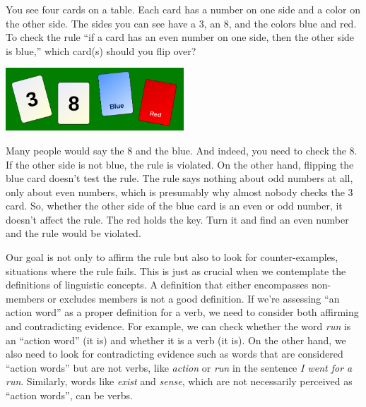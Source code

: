 \begin{tcolorbox}[float*, title=A thinking trap, colback=white]
    You see four cards on a table. Each card has a number on one side and a color on the other side. The sides you can see have a 3, an 8, and the colors blue and red. To check the rule ``if a card has an even number on one side, then the other side is blue,'' which card(s) should you flip over?
    \begin{center}
        \includegraphics[width=0.5\textwidth]{figures/wason.png}
        \tiny {}
    \end{center}
    Many people would say the 8 and the blue. And indeed, you need to check the 8. If the other side is not blue, the rule is violated. On the other hand, flipping the blue card doesn't test the rule. The rule says nothing about odd numbers at all, only about even numbers, which is presumably why almost nobody checks the 3 card. So, whether the other side of the blue card is an even or odd number, it doesn't affect the rule. The red holds the key. Turn it and find an even number and the rule would be violated.

    Our goal is not only to affirm the rule but also to look for counter-examples, situations where the rule fails. This is just as crucial when we contemplate the definitions of linguistic concepts. A definition that either encompasses non-members or excludes members is not a good definition. If we're assessing ``an action word'' as a proper definition for a verb, we need to consider both affirming and contradicting evidence. For example, we can check whether the word \textit{run} is an ``action word'' (it is) and whether it is a verb (it is). On the other hand, we also need to look for contradicting evidence such as words that are considered ``action words'' but are not verbs, like \textit{action} or \textit{run} in the sentence \textit{I went for a run}. Similarly, words like \textit{exist} and \textit{sense}, which are not necessarily perceived as ``action words'', can be verbs.
    
\end{tcolorbox}

